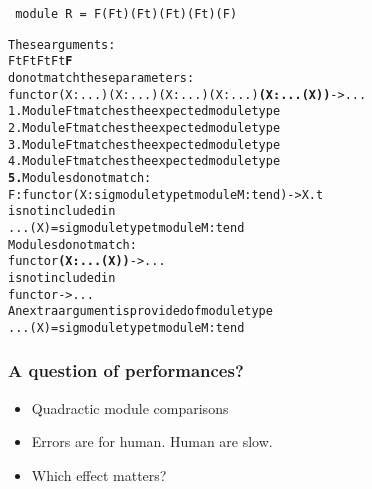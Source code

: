 \documentclass[a4paper,11pt]{beamer}
\begin{document}
\begin{frame}[fragile]
\begin{verbatim}
 module R = F(Ft)(Ft)(Ft)(Ft)(F)
\end{verbatim}
\begin{alltt}
     These arguments:
       {\color{green}{}Ft} {\color{green}{}Ft} {\color{green}{}Ft} {\color{green}{}Ft} {\color{magenta}{}\bfseries{}F}
     do not match these parameters:
       functor {\color{green}{}(X : ...)} {\color{green}{}(X : ...)} {\color{green}{}(X : ...)} {\color{green}{}(X : ...)} {\color{magenta}{}\bfseries{}(X : ...(X))} -> ...
{\color{green}{}1.} Module Ft matches the expected module type
{\color{green}{}2.} Module Ft matches the expected module type
{\color{green}{}3.} Module Ft matches the expected module type
{\color{green}{}4.} Module Ft matches the expected module type
{\color{magenta}{}\bfseries{}5.} Modules do not match:
     F : functor (X : sig module type t module M : t end) -> X.t
   is not included in
     ...(X) = sig module type t module M : t end
   Modules do not match:
     functor {\color{red}{}\bfseries{}(X : ...(X))} -> ...
   is not included in
     functor {\color{red}{}\bfseries{}} -> ...
      An extra argument is provided of module type
          ...(X) = sig module type t module M : t end

\end{alltt}
\end{frame}

\begin{frame}[fragile] \frametitle{A question of performances?}
  \begin{itemize}
    \item{Quadractic module comparisons}
    \item{Errors are for human. Human are slow.}
    \item{Which effect matters?}
  \end{itemize}
\end{frame}
\end{document}

